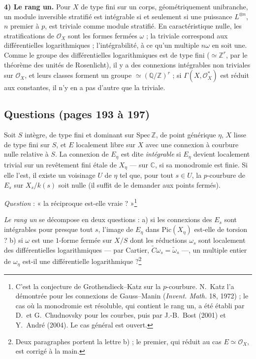 \documentclass[11pt,a4paper]{article}
\begin{document}
\textbf{4) Le rang un.} Pour $X$ de type fini sur un corps, géométriquement
unibranche, un module inversible stratifié est intégrable si et seulement
si une puissance $L^{\otimes n}$, $n$ premier à $p$, est triviale comme module
stratifié. En caractéristique nulle, les stratifications de $\mathcal{O}_X$ sont
les formes fermées $\omega$ ; la triviale correspond aux différentielles
logarithmiques ; l'intégrabilité, à ce qu'un multiple $n\omega$ en soit une.
Comme le groupe des différentielles logarithmiques est de type fini
($\simeq \mathbb{Z}^r$, par le théorème des unités de Rosenlicht), il y a des
connexions intégrables non triviales sur $\mathcal{O}_X$, et leurs classes
forment un groupe $\simeq (\mathbb{Q}/\mathbb{Z})^r$ ; si $\Gamma(X,
\mathcal{O}_X^*)$ est réduit aux constantes, il n'y en a pas d'autre que la
triviale.

\subsection*{Questions (pages 193 à 197)}

Soit $S$ intègre, de type fini et dominant sur $\mathrm{Spec}\,\mathbb{Z}$, de point
générique $\eta$, $X$ lisse de type fini sur $S$, et $E$ localement libre sur
$X$ avec une connexion à courbure nulle relative à $S$. La connexion de
$E_\eta$ est dite \emph{intégrable} si $E_\eta$ devient localement trivial sur
un revêtement fini étale de $X_\eta$ — sur $\mathbb{C}$, si sa monodromie est
finie. Si elle l'est, il existe un voisinage $U$ de $\eta$ tel que, pour
tout $s \in U$, la $p$-courbure de $E_s$ sur $X_s/k(s)$ soit nulle (il suffit
de le demander aux points fermés).

\emph{Question} : « la réciproque est-elle vraie ? »\footnote{C'est la
conjecture de Grothendieck--Katz sur la $p$-courbure. N.~Katz l'a démontrée
pour les connexions de Gauss--Manin (\emph{Invent. Math.} 18, 1972) ; le cas
où la monodromie est résoluble, qui contient le rang un, a été établi par
D.~et G.~Chudnovsky pour les courbes, puis par J.-B.~Bost (2001) et Y.~André
(2004). Le cas général est ouvert.}

\emph{Le rang un} se décompose en deux questions : a) si les connexions des
$E_s$ sont intégrables pour presque tout $s$, l'image de $E_\eta$ dans
$\mathrm{Pic}(X_\eta)$ est-elle de torsion ? b) si $\omega$ est une $1$-forme
fermée sur $X/S$ dont les réductions $\omega_s$ sont localement des
différentielles logarithmiques — par Cartier, $\widetilde C\omega_s =
\tilde\omega_s$ —, un multiple entier de $\omega_\eta$ est-il une
différentielle logarithmique ?\footnote{Deux paragraphes portent la lettre
b) ; le premier, qui réduit au cas $E \simeq \mathcal{O}_X$, est corrigé à la
main.}
\end{document}

